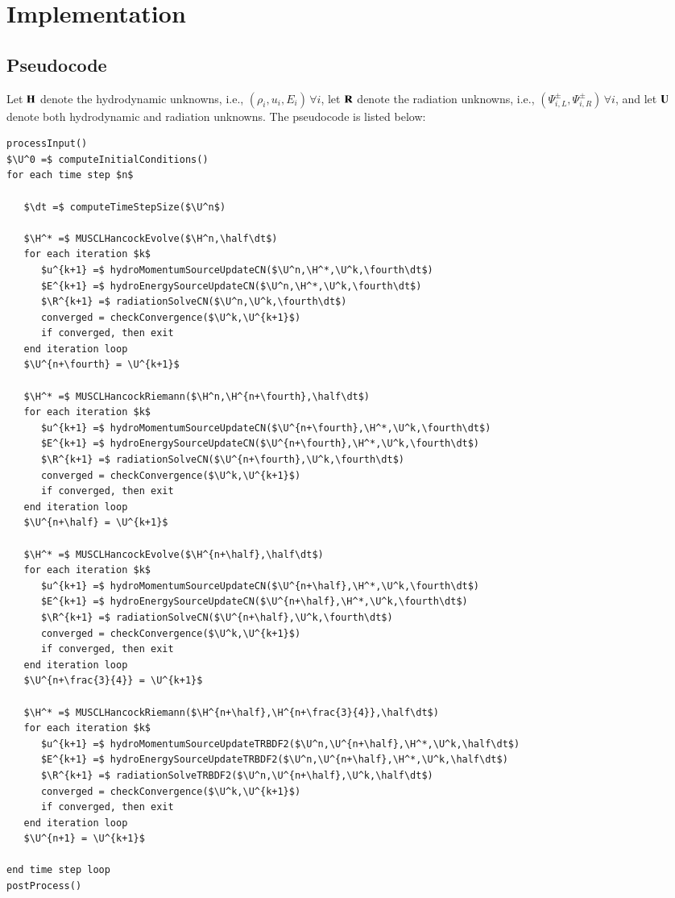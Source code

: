 \section{Implementation}
\subsection{Pseudocode}
Let $\mathbf{H}$ denote the hydrodynamic unknowns, i.e., $(\rho_i,u_i,E_i)\,\forall i$,
let $\mathbf{R}$ denote the radiation unknowns, i.e., $(\Psi_{i,L}^\pm,\Psi_{i,R}^\pm)
\,\forall i$, and let $\mathbf{U}$ denote both hydrodynamic and radiation
unknowns. The pseudocode is listed below:

\begin{lstlisting}[mathescape,columns=fullflexible,
   basicstyle=\fontfamily{lmvtt}\selectfont]
processInput()
$\U^0 =$ computeInitialConditions()
for each time step $n$

   $\dt =$ computeTimeStepSize($\U^n$)

   $\H^* =$ MUSCLHancockEvolve($\H^n,\half\dt$)
   for each iteration $k$
      $u^{k+1} =$ hydroMomentumSourceUpdateCN($\U^n,\H^*,\U^k,\fourth\dt$)
      $E^{k+1} =$ hydroEnergySourceUpdateCN($\U^n,\H^*,\U^k,\fourth\dt$)
      $\R^{k+1} =$ radiationSolveCN($\U^n,\U^k,\fourth\dt$)
      converged = checkConvergence($\U^k,\U^{k+1}$)
      if converged, then exit
   end iteration loop
   $\U^{n+\fourth} = \U^{k+1}$

   $\H^* =$ MUSCLHancockRiemann($\H^n,\H^{n+\fourth},\half\dt$)
   for each iteration $k$
      $u^{k+1} =$ hydroMomentumSourceUpdateCN($\U^{n+\fourth},\H^*,\U^k,\fourth\dt$)
      $E^{k+1} =$ hydroEnergySourceUpdateCN($\U^{n+\fourth},\H^*,\U^k,\fourth\dt$)
      $\R^{k+1} =$ radiationSolveCN($\U^{n+\fourth},\U^k,\fourth\dt$)
      converged = checkConvergence($\U^k,\U^{k+1}$)
      if converged, then exit
   end iteration loop
   $\U^{n+\half} = \U^{k+1}$

   $\H^* =$ MUSCLHancockEvolve($\H^{n+\half},\half\dt$)
   for each iteration $k$
      $u^{k+1} =$ hydroMomentumSourceUpdateCN($\U^{n+\half},\H^*,\U^k,\fourth\dt$)
      $E^{k+1} =$ hydroEnergySourceUpdateCN($\U^{n+\half},\H^*,\U^k,\fourth\dt$)
      $\R^{k+1} =$ radiationSolveCN($\U^{n+\half},\U^k,\fourth\dt$)
      converged = checkConvergence($\U^k,\U^{k+1}$)
      if converged, then exit
   end iteration loop
   $\U^{n+\frac{3}{4}} = \U^{k+1}$

   $\H^* =$ MUSCLHancockRiemann($\H^{n+\half},\H^{n+\frac{3}{4}},\half\dt$)
   for each iteration $k$
      $u^{k+1} =$ hydroMomentumSourceUpdateTRBDF2($\U^n,\U^{n+\half},\H^*,\U^k,\half\dt$)
      $E^{k+1} =$ hydroEnergySourceUpdateTRBDF2($\U^n,\U^{n+\half},\H^*,\U^k,\half\dt$)
      $\R^{k+1} =$ radiationSolveTRBDF2($\U^n,\U^{n+\half},\U^k,\half\dt$)
      converged = checkConvergence($\U^k,\U^{k+1}$)
      if converged, then exit
   end iteration loop
   $\U^{n+1} = \U^{k+1}$

end time step loop
postProcess()
\end{lstlisting}

